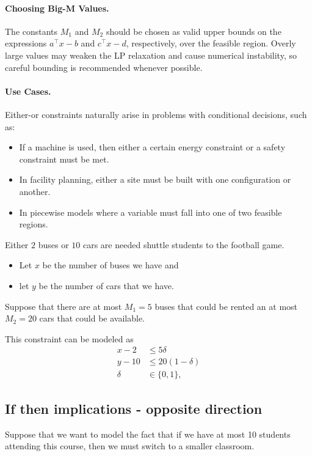 \paragraph{Choosing Big-M Values.}
The constants \(M_1\) and \(M_2\) should be chosen as valid upper bounds on the expressions \(a^\top x - b\) and \(c^\top x - d\), respectively, over the feasible region. Overly large values may weaken the LP relaxation and cause numerical instability, so careful bounding is recommended whenever possible.

\paragraph{Use Cases.}
Either-or constraints naturally arise in problems with conditional decisions, such as:
\begin{itemize}
    \item If a machine is used, then either a certain energy constraint or a safety constraint must be met.
    \item In facility planning, either a site must be built with one configuration or another.
    \item In piecewise models where a variable must fall into one of two feasible regions.
\end{itemize}



\begin{example}{}{}
Either $2$ buses or $10$ cars are needed shuttle students to the football game.  
\begin{itemize}
\item Let $x$ be the number of buses we have and 
\item let $y$ be the number of cars that we have.  
\end{itemize}
Suppose that there are at most $M_1 = 5$ buses that could be rented an at most $M_2 = 20$ cars that could be available.

This constraint can be modeled as 
\begin{equation}
\begin{split}
x - 2 &\leq 5\delta\\
y - 10 &\leq 20 (1-\delta)\\
\delta &\in \{0,1\},
\end{split}
\end{equation}
\end{example}
\subsection{If then implications - opposite direction}
Suppose that we want to model the fact that if we have at most 10 students attending this course, then we must switch to a smaller classroom.   

